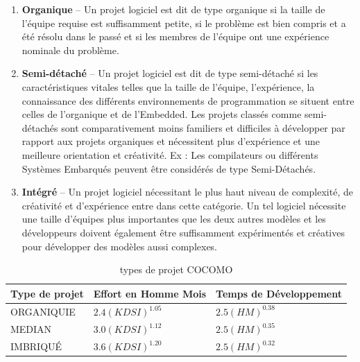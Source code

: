 \begin{enumerate}
	      \begin{enumerate}
		      \item \textbf{Organique} – Un projet logiciel est dit de type organique si la taille de l’équipe requise est suffisamment petite, si le problème est bien compris et a été résolu dans le passé et si les membres de l’équipe ont une expérience nominale du problème.
		      \item \textbf{Semi-détaché} – Un projet logiciel est dit de type semi-détaché si les caractéristiques vitales telles que la taille de l’équipe, l’expérience, la connaissance des différents environnements de programmation se situent entre celles de l’organique et de l’Embedded. Les projets classés comme semi-détachés sont comparativement moins familiers et difficiles à développer par rapport aux projets organiques et nécessitent plus d’expérience et une meilleure orientation et créativité. Ex : Les compilateurs ou différents Systèmes Embarqués peuvent être considérés de type Semi-Détachés.
		      \item \textbf{Intégré} – Un projet logiciel nécessitant le plus haut niveau de complexité, de créativité et d’expérience entre dans cette catégorie. Un tel logiciel nécessite une taille d’équipes plus importantes que les deux autres modèles et les développeurs doivent également être suffisamment expérimentés et créatives pour développer des modèles aussi complexes.
	      \end{enumerate}

	      \begin{table}[h!]
		      \caption {types de projet COCOMO}
		      \begin{tabularx}{\textwidth} {
				      | >{\raggedright\arraybackslash}X
				      | >{\centering\arraybackslash}X
				      | >{\raggedleft\arraybackslash}X |}
			      \hline
			      \textbf{Type de projet} & \textbf{Effort en Homme Mois} & \textbf{Temps de Développement} \\
			      \hline
			      ORGANIQUIE              & $2.4(KDSI)^{1.05}$            & $2.5(HM)^{0.38}$                \\
			      \hline
			      MEDIAN                  & $3.0(KDSI)^{1.12}$            & $2.5(HM)^{0.35}$                \\
			      \hline
			      IMBRIQUÉ                & $3.6(KDSI)^{1.20}$            & $2.5(HM)^{0.32}$                \\
			      \hline
		      \end{tabularx}
	      \end{table}


\end{enumerate}
